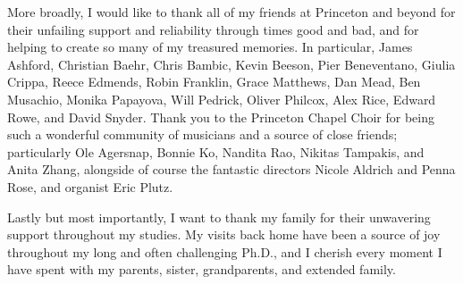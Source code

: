 More broadly, I would like to thank all of my friends at Princeton and beyond
for their unfailing support and reliability through times good and bad, and for
helping to create so many of my treasured memories. In particular, James
Ashford, Christian Baehr,
Chris Bambic, Kevin Beeson, Pier Beneventano, Giulia Crippa, Reece
Edmends, Robin Franklin, Grace Matthews, Dan Mead, Ben Musachio, Monika
Papayova, Will Pedrick, Oliver Philcox, Alex Rice, Edward Rowe, and David
Snyder. Thank you to the Princeton Chapel Choir for being such a wonderful
community of musicians and a source of close friends; particularly Ole
Agersnap, Bonnie Ko, Nandita Rao, Nikitas Tampakis, and Anita Zhang, alongside
of course the fantastic directors Nicole Aldrich and Penna Rose, and organist
Eric Plutz.

Lastly but most importantly, I want to thank my family for their unwavering
support throughout my studies. My visits back home have been a source of joy
throughout my long and often challenging Ph.D., and I cherish every moment I
have spent with my parents, sister, grandparents, and extended family.

